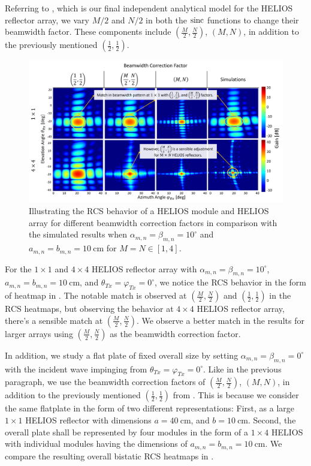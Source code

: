 Referring to , which is our final independent analytical model for the HELIOS reflector array, we vary $M/2$ and $N/2$ in both the $\operatorname{sinc}$ functions to change their beamwidth factor. These components include $(\frac{M}{2},\frac{N}{2})$, $(M,N)$, in addition to the previously mentioned $(\frac{1}{2},\frac{1}{2})$. 
\begin{figure}[tb]
	\centering
	\includegraphics[width=1.0\linewidth]{images/Section 3 Images/Casestudy_beamwidth}
	\caption{Illustrating the RCS behavior of a HELIOS module and HELIOS array for different beamwidth correction factors in comparison with the simulated results when $\alpha_{m,n}=\beta_{m,n}=10^\circ$ and $a_{m,n}=b_{m,n}=\SI{10}{\centi\meter}$ for $M=N\in[1,4]$.}
	\label{fig:Casestudy_beamwidth}
\end{figure}
For the $\num{1}\times \num{1}$ and $\num{4}\times \num{4}$ HELIOS reflector array with $\alpha_{m,n}=\beta_{m,n}=10^\circ$, $a_{m,n}=b_{m,n}=\SI{10}{\centi\meter}$, and $\theta_{Tx}=\varphi_{Tx}=0^\circ$, we notice the RCS behavior in the form of heatmap in . The notable match is observed at $(\frac{M}{2},\frac{N}{2})$ and $(\frac{1}{2},\frac{1}{2})$ in the RCS heatmaps, but observing the behavior at $\num{4}\times \num{4}$ HELIOS reflector array, there's a sensible match at $(\frac{M}{2},\frac{N}{2})$.  We observe a better match in the results for larger arrays using  $(\frac{M}{2},\frac{N}{2})$ as the beamwidth correction factor.

In addition, we study a flat plate of fixed overall size by setting $\alpha_{m,n}=\beta_{m,n}=0^\circ$ with the incident wave impinging from $\theta_{Tx}=\varphi_{Tx}=0^\circ$. Like in the previous paragraph, we use the beamwidth correction factors of $(\frac{M}{2},\frac{N}{2})$, $(M,N)$, in addition to the previously mentioned $(\frac{1}{2},\frac{1}{2})$ from . This is because we consider the same flatplate in the form of two different representations: First, as a large $\num{1}\times \num{1}$ HELIOS reflector with dimensions $a=\SI{40}{\centi\meter}$, and $b=\SI{10}{\centi\meter}$. Second, the overall plate shall be represented by four modules in the form of a $\num{1}\times \num{4}$ HELIOS with individual modules having the dimensions of $a_{m,n}=b_{m,n}=\SI{10}{\centi\meter}$. We compare the resulting overall bistatic RCS heatmaps in .


